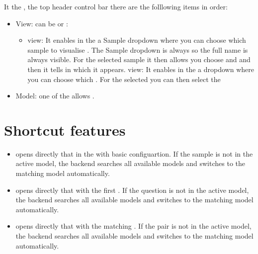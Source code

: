 \documentclass[11pt]{article}
\begin{document}
It the , the top header control bar there are the folllowing items in order:
\begin{itemize}
    \item View: can be  or :
\begin{itemize}
    \item {} view: It enables in the  a Sample dropdown where you can choose which sample to visualise . The Sample dropdown is always so the full name is always visible. 
    For the selected sample it then allows you choose  and  and then it tells in which  it appears.
      view: It enables in the  a  dropdown where you can choose which .
     For the selected  you can then select the 
\end{itemize}
    \item Model: one of the allows \termSimulator.
\end{itemize}

\section*{Shortcut features}
\begin{itemize}
    \item {} opens directly that  in the  with basic configuartion. If the sample is not in the active model, the backend searches all available models and switches to the matching model automatically.
    \item {} opens directly that  with the first . If the question is not in the active model, the backend searches all available models and switches to the matching model automatically.
    \item {} opens directly that  with the matching . If the pair is not in the active model, the backend searches all available models and switches to the matching model automatically.
\end{itemize}
\end{document}
